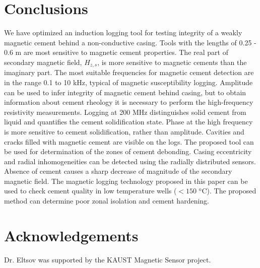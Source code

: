 \documentclass[10pt,twoside]{article}
\begin{document}
\section{Conclusions}
We have optimized an induction logging tool for testing integrity of a weakly magnetic cement behind a non-conductive casing. Tools with the lengths of 0.25 - 0.6 m are most sensitive to magnetic cement properties. The real part of secondary magnetic field, $H_{z,s}$, is more sensitive to magnetic cements than the imaginary part. The most suitable frequencies for magnetic cement detection are in the range 0.1 to 10 kHz, typical of magnetic susceptibility logging. Amplitude can be used to infer integrity of magnetic cement behind casing, but to obtain information about cement rheology it is necessary to perform the high-frequency resistivity measurements. Logging at 200 MHz distinguishes solid cement from liquid and quantifies the cement solidification state. Phase at the high frequency is more sensitive to cement solidification, rather than amplitude. Cavities and cracks filled with magnetic cement are visible on the logs. The proposed tool can be used for determination of the zones of cement debonding. Casing eccentricity and radial inhomogeneities can be detected using the radially distributed sensors. Absence of cement causes a sharp decrease of magnitude of the secondary magnetic field. The magnetic logging technology proposed in this paper can be used to check cement quality in low temperature wells ($<150$  $^{\mathrm{o}}$C). The proposed method can determine poor zonal isolation and cement hardening.

\section{Acknowledgements}

Dr. Eltsov was supported by the KAUST Magnetic Sensor project.


\clearpage
\vskip -0.2in



\vskip 0.2in
\end{document}
